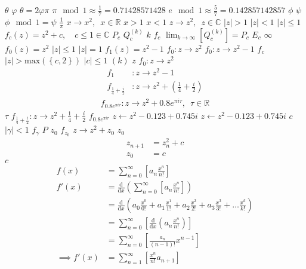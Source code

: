 \documentclass{article}
\begin{document}
$\mathtt{\theta}$
$\varphi$
$\theta =2 \varphi  \pi$
$\pi \mod 1 \approx \frac{1}{7}=0.71428571428 $
$e \mod 1 \approx \frac{5}{7}= 0.142857142857 $
$\phi$
$\psi$
$\phi \mod 1 =
\psi$
$\frac{1}{\pi}$
$x \rightarrow x^{2}, \enspace x \in \mathbb{R}$
$x>1$
$x<1$
$z \rightarrow z^{2}, \enspace z \in \mathbb{C}$
$\left\lvert z \right\rvert >1$
$\left\lvert z \right\rvert <1$
$\left\lvert z \right\rvert \leq 1$
$f_{c}(z) = z^{2} + c, \quad c \leq 1 \in \mathbb{C}$
$P_{c}$
$Q^{(k)}_{c}$
$k$
$f_{c}$
$\lim_{k \rightarrow \infty} \left[ Q^{(k)}_{c}  \right] = P_{c}$
$E_{c}$
$\infty$
$f_{0}(z) = z^{2}$
$\left\lvert z  \right \rvert \leq 1$
$\left\lvert z  \right \rvert = 1$
$f_{1}(z) = z^{2} - 1$
$f_{0}: z \rightarrow z^{2}$
$f_{0}: z \rightarrow z^{2} - 1$
$f_{c}$
$\left\lvert z \right\rvert >
\mathrm{max}\left(\left\{c, 2\right\}\right)$
$\left\lvert c \right\rvert \leq 1$
$(k)$
$z$
$f_{0}: z \rightarrow z^{2}$
\begin{align*}
f_{1}&: z \rightarrow
z^{2} - 1 \\
f_{\frac{1}{4} + \frac{i}{2}}&: z
\rightarrow z^{2} + (\frac{1}{4} + \frac{i}{2})
\end{align*}
\begin{align}
f_{0.8 e^{\pi i \tau}}: z \rightarrow z^{2} + 0.8 e^{\pi
i \tau}, \enspace \tau \in \mathbb{R}
\end{align}
$\tau$
$f_{\frac{1}{4} + \frac{i}{2}}: z \rightarrow z^{2} + \frac{1}{4} + \frac{i}{2}$
$f_{0.8 e^{\pi i \tau}}$
$z \leftarrow z^{2} -0.123+0.745i$
$z \leftarrow z^{2} -0.123+0.745i$
$c$
$\left\lvert \gamma \right \rvert < 1$
$f_{\gamma}$
$P$
$z_{0}$
$f_{z_{0}}$
$z \rightarrow z^{2} + z_{0}$
$z_{0}$
\begin{align}
z_{n+1} &= z^{2}_n + c \label{eq:mb-sequence} \\
z_{0}   &= c
\end{align}
$c$
\begin{align}
    f\left( x \right) &= \sum^{\infty}_{n= 0}   \left[ a_n \frac{x^n}{n!} \right] \label{eq:exp-pow-series} \\
f'\left( x \right) &= \frac{\mathrm{d} }{\mathrm{d} x}\left( \sum^{\infty}_{n= 0}   \left[ a_n \frac{x^n}{n!} \right]  \right) \nonumber \\
&= \frac{\mathrm{d}}{\mathrm{d} x} \left( a_0 \frac{x^0}{0!} +  a_1 \frac{x^1}{1!} +  a_2 \frac{x^2}{2!}+  a_3 \frac{x^3}{3! } +  \ldots \frac{x^k}{k!} \right) \nonumber \\
&= \sum^{\infty}_{n= 0}   \left[ \frac{\mathrm{d} }{\mathrm{d} x}\left( a_n \frac{x^n}{n!} \right) \right] \nonumber \\
&= \sum^{\infty}_{n= 0}   {\left[{ \frac{a_n}{{\left({ n- 1 }\right)!}} } x^{n- 1}  \right]} \nonumber \\
\implies f'(x) &= \sum^{\infty}_{n= 1}   {\left[{ \frac{x^n}{n!}a_{n+  1} }\right]} \label{eq:exp-pow-series-sol}
\end{align}
\end{document}
